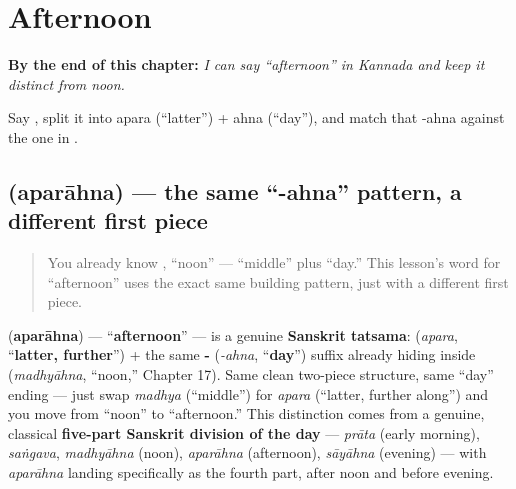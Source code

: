 
\chapter{Afternoon}
\label{ch:ka-afternoon}

\begin{chapteropening}
\textbf{By the end of this chapter:} \emph{I can say \textquotedblleft{}afternoon\textquotedblright{} in Kannada and keep it distinct from noon.}

Say , split it into apara (\textquotedblleft{}latter\textquotedblright{}) + ahna (\textquotedblleft{}day\textquotedblright{}), and match that -ahna against the one in .
\end{chapteropening}

\section[\texorpdfstring{\kn{ಅಪರಾಹ್ನ} (aparāhna)}{ಅಪರಾಹ್ನ (aparāhna)}]{ (aparāhna) — the same \textquotedblleft{}-ahna\textquotedblright{} pattern, a different first piece}

\label{lesson:KA-C28-aparahna}



\begin{quote}
You already know , \textquotedblleft{}noon\textquotedblright{} — \textquotedblleft{}middle\textquotedblright{} plus \textquotedblleft{}day.\textquotedblright{} This lesson's word for \textquotedblleft{}afternoon\textquotedblright{} uses the exact same building pattern, just with a different first piece.
\end{quote}

\begin{cousinweb}
\textbf{} (\textbf{aparāhna}) — \textquotedblleft{}\textbf{afternoon}\textquotedblright{} — is a genuine \textbf{Sanskrit tatsama}: \textbf{} (\emph{apara}, \textquotedblleft{}\textbf{latter, further}\textquotedblright{}) + the same \textbf{-} (\emph{-ahna}, \textquotedblleft{}\textbf{day}\textquotedblright{}) suffix already hiding inside \textbf{} (\emph{madhyāhna}, \textquotedblleft{}noon,\textquotedblright{} Chapter 17). Same clean two-piece structure, same \textquotedblleft{}day\textquotedblright{} ending — just swap \emph{madhya} (\textquotedblleft{}middle\textquotedblright{}) for \emph{apara} (\textquotedblleft{}latter, further along\textquotedblright{}) and you move from \textquotedblleft{}noon\textquotedblright{} to \textquotedblleft{}afternoon.\textquotedblright{} This distinction comes from a genuine, classical \textbf{five-part Sanskrit division of the day} — \emph{prāta} (early morning), \emph{saṅgava}, \emph{madhyāhna} (noon), \emph{aparāhna} (afternoon), \emph{sāyāhna} (evening) — with \emph{aparāhna} landing specifically as the fourth part, after noon and before evening.
\end{cousinweb}

